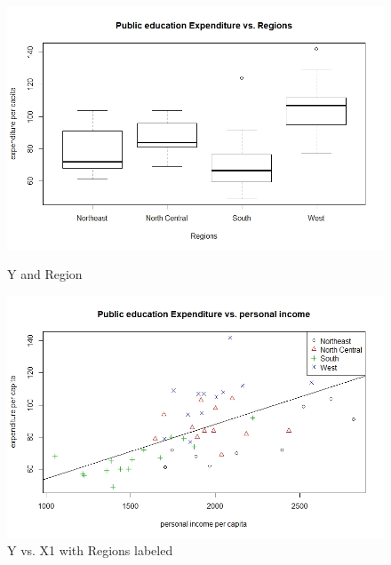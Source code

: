 \documentclass[12pt,letterpaper]{article}
\begin{document}
    \begin{figure}
		\centering
		\includegraphics[width=0.6\linewidth]{Y vs Region.jpeg}
		\caption{Y and Region}
		\label{fig:YR}
		\vspace{1cm}	
		\includegraphics[width=\linewidth]{Y vs X1R.jpeg}
		\caption{Y vs. X1 with Regions labeled}
		\label{fig:YX1R}						
	\end{figure}
\end{document}
